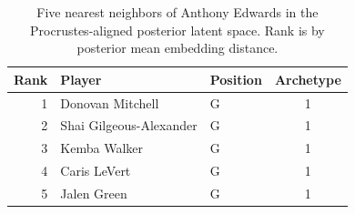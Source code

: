 \begin{table}[htbp]
  \centering\small
  \begin{tabular}{rllc}
    \toprule
    Rank & Player & Position & Archetype \\
    \midrule
    1 & Donovan Mitchell & G & 1 \\
    2 & Shai Gilgeous-Alexander & G & 1 \\
    3 & Kemba Walker & G & 1 \\
    4 & Caris LeVert & G & 1 \\
    5 & Jalen Green & G & 1 \\
    \bottomrule
  \end{tabular}
  \caption{Five nearest neighbors of Anthony Edwards in the Procrustes-aligned posterior latent space. Rank is by posterior mean embedding distance.}
  \label{tab:Anthony_Edwards_neighbors}
\end{table}

